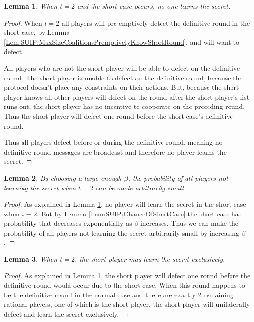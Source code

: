 \documentclass{dalcsthesis}
\newtheorem{lemma}{Lemma}
\begin{document}
\begin{lemma} When $t=2$ and the short case occurs, no one learns the secret. \label{Lem:SUIP:MinimumThresholdAndShortCaseMeansNoOneLearnsSecret} \end{lemma}
\begin{proof}
When $t=2$ all players will pre-emptively detect the definitive round in the short case, by Lemma \ref{Lem:SUIP:MaxSizeCoalitionsPremptivelyKnowShortRound}, and will want to defect.

All players who are not the short player will be able to defect on the definitive round. The short player is unable to defect on the definitive round, because the protocol doesn't place any constraints on their actions. But, because the short player knows all other players will defect on the round after the short player's list runs out, the short player has no incentive to cooperate on the preceding round. Thus the short player will defect one round before the short case's definitive round.

Thus all players defect before or during the definitive round, meaning no definitive round messages are broadcast and therefore no player learns the secret.
\end{proof}

\begin{lemma} By choosing a large enough $\beta$, the probability of all players not learning the secret when $t=2$ can be made arbitrarily small. \label{Lem:SUIP:NoPlayerLearningSecretIsReducible} \end{lemma} 
\begin{proof}
As explained in Lemma \ref{Lem:SUIP:MinimumThresholdAndShortCaseMeansNoOneLearnsSecret}, no player will learn the secret in the short case when $t=2$. But by Lemma \ref{Lem:SUIP:ChanceOfShortCase} the short case has probability that decreases exponentially as $\beta$ increases. Thus we can make the probability of all players not learning the secret arbitrarily small by increasing $\beta$.
\end{proof}

\begin{lemma} When $t=2$, the short player may learn the secret exclusively. \label{Lem:SUIP:ShortPlayerMayLearnSecretExclusively} \end{lemma} 
\begin{proof}
As explained in Lemma \ref{Lem:SUIP:MinimumThresholdAndShortCaseMeansNoOneLearnsSecret}, the short player will defect one round before the definitive round would occur due to the short case. When this round happens to be the definitive round in the normal case and there are exactly 2 remaining rational players, one of which is the short player, the short player will unilaterally defect and learn the secret exclusively.
\end{proof}
\end{document}
